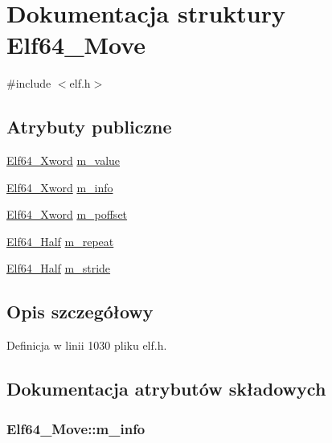 \hypertarget{struct_elf64___move}{\section{Dokumentacja struktury Elf64\-\_\-\-Move}
\label{struct_elf64___move}
}


{\ttfamily \#include $<$elf.\-h$>$}

\subsection*{Atrybuty publiczne}
\begin{DoxyCompactItemize}
\item 
\hyperlink{elf_8h_a5447a48a3dae0bd24f606415268c6fe4}{Elf64\-\_\-\-Xword} \hyperlink{struct_elf64___move_ab6ef52b74b3742b569dcacc4a7f835df}{m\-\_\-value}
\item 
\hyperlink{elf_8h_a5447a48a3dae0bd24f606415268c6fe4}{Elf64\-\_\-\-Xword} \hyperlink{struct_elf64___move_a543c917c40646df01c33537a6d8b86cf}{m\-\_\-info}
\item 
\hyperlink{elf_8h_a5447a48a3dae0bd24f606415268c6fe4}{Elf64\-\_\-\-Xword} \hyperlink{struct_elf64___move_a36fe21def9afee88be6acc62e45fdeba}{m\-\_\-poffset}
\item 
\hyperlink{elf_8h_adb6a5584018b431da3472e7c6a7fd731}{Elf64\-\_\-\-Half} \hyperlink{struct_elf64___move_ab6f1c59b8b9789cdd223fa525937dbdb}{m\-\_\-repeat}
\item 
\hyperlink{elf_8h_adb6a5584018b431da3472e7c6a7fd731}{Elf64\-\_\-\-Half} \hyperlink{struct_elf64___move_ac999afc6aec249cd19ebbef408228c95}{m\-\_\-stride}
\end{DoxyCompactItemize}


\subsection{Opis szczegółowy}


Definicja w linii 1030 pliku elf.\-h.



\subsection{Dokumentacja atrybutów składowych}
\hypertarget{struct_elf64___move_a543c917c40646df01c33537a6d8b86cf}{
\subsubsection[{m\-\_\-info}]{ Elf64\-\_\-\-Move\-::m\-\_\-info}}\label{struct_elf64___move_a543c917c40646df01c33537a6d8b86cf}


